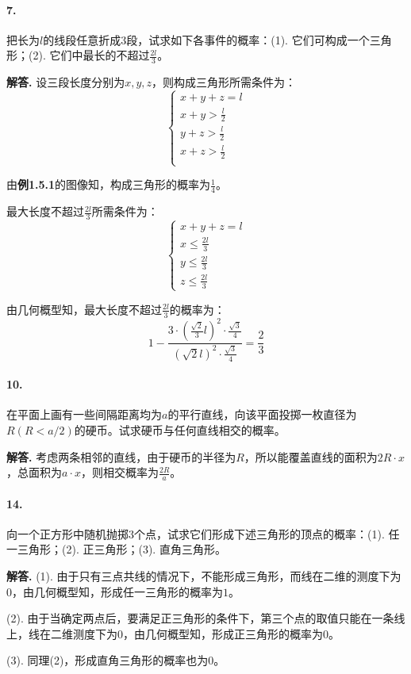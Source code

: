 \documentclass[12pt, a4paper, oneside]{ctexart}
\newenvironment{solution}{\par\noindent\textbf{解答. }}{\bigskip\par}
\begin{document}
\paragraph{7.}把长为$l$的线段任意折成$3$段，试求如下各事件的概率：(1). 它们可构成一个三角形；(2). 它们中最长的不超过$\frac{2l}{3}$。
\begin{solution}
    设三段长度分别为$x,y,z$，则构成三角形所需条件为：
    \begin{equation*}
        \begin{cases}
            x+y+z=l\\
            x+y>\frac{l}{2}\\
            y+z>\frac{l}{2}\\
            x+z>\frac{l}{2}\\
        \end{cases}
    \end{equation*}
    
    由\textbf{例1.5.1}的图像知，构成三角形的概率为$\frac{1}{4}$。

    最大长度不超过$\frac{2l}{3}$所需条件为：
    \begin{equation*}
        \begin{cases}
            x+y+z=l\\
            x\leqslant \frac{2l}{3}\\
            y\leqslant \frac{2l}{3}\\
            z\leqslant \frac{2l}{3}
        \end{cases}
    \end{equation*}

    由几何概型知，最大长度不超过$\frac{2l}{3}$的概率为：
    \begin{equation*}
        1-\frac{3\cdot\left(\frac{\sqrt{2}}{3}l\right)^2\cdot\frac{\sqrt{3}}{4}}{(\sqrt{2}l)^2\cdot\frac{\sqrt{3}}{4}}=\frac{2}{3}
    \end{equation*}
\end{solution}
\paragraph{10.}在平面上画有一些间隔距离均为$a$的平行直线，向该平面投掷一枚直径为$R(R<a/2)$的硬币。试求硬币与任何直线相交的概率。
\begin{solution}
    考虑两条相邻的直线，由于硬币的半径为$R$，所以能覆盖直线的面积为$2R\cdot x$，总面积为$a\cdot x$，则相交概率为$\frac{2R}{a}$。
\end{solution}
\paragraph{14.}向一个正方形中随机抛掷$3$个点，试求它们形成下述三角形的顶点的概率：(1). 任一三角形；(2). 正三角形；(3). 直角三角形。
\begin{solution}
    (1). 由于只有三点共线的情况下，不能形成三角形，而线在二维的测度下为$0$，由几何概型知，形成任一三角形的概率为$1$。

    (2). 由于当确定两点后，要满足正三角形的条件下，第三个点的取值只能在一条线上，线在二维测度下为$0$，由几何概型知，形成正三角形的概率为$0$。

    (3). 同理(2)，形成直角三角形的概率也为$0$。
\end{solution}
\end{document}

